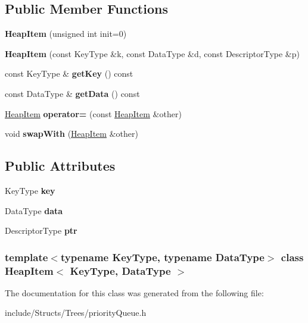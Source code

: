 \subsection*{Public Member Functions}
\begin{DoxyCompactItemize}
\item 
\hypertarget{class_heap_item_a03c42d4bbc4c16ee8abc7fd6b1c97767}{
{\bfseries HeapItem} (unsigned int init=0)}
\label{class_heap_item_a03c42d4bbc4c16ee8abc7fd6b1c97767}

\item 
\hypertarget{class_heap_item_add75cdd3ec5a8f0d3442e4a6ab4e862b}{
{\bfseries HeapItem} (const KeyType \&k, const DataType \&d, const DescriptorType \&p)}
\label{class_heap_item_add75cdd3ec5a8f0d3442e4a6ab4e862b}

\item 
\hypertarget{class_heap_item_a9ebbd7fe9118ec76958c0ea8ebb9cec2}{
const KeyType \& {\bfseries getKey} () const }
\label{class_heap_item_a9ebbd7fe9118ec76958c0ea8ebb9cec2}

\item 
\hypertarget{class_heap_item_a48266d15d7941344d977a157d23f4b15}{
const DataType \& {\bfseries getData} () const }
\label{class_heap_item_a48266d15d7941344d977a157d23f4b15}

\item 
\hypertarget{class_heap_item_ab285b88a3143ca4e88fd7ad4151a22e3}{
\hyperlink{class_heap_item}{HeapItem} {\bfseries operator=} (const \hyperlink{class_heap_item}{HeapItem} \&other)}
\label{class_heap_item_ab285b88a3143ca4e88fd7ad4151a22e3}

\item 
\hypertarget{class_heap_item_a3dcc271e453d3f48ad9da5912c818781}{
void {\bfseries swapWith} (\hyperlink{class_heap_item}{HeapItem} \&other)}
\label{class_heap_item_a3dcc271e453d3f48ad9da5912c818781}

\end{DoxyCompactItemize}
\subsection*{Public Attributes}
\begin{DoxyCompactItemize}
\item 
\hypertarget{class_heap_item_ad9d7dd6dcc9c0e56bd1830d655b2474e}{
KeyType {\bfseries key}}
\label{class_heap_item_ad9d7dd6dcc9c0e56bd1830d655b2474e}

\item 
\hypertarget{class_heap_item_ab04530f960d08905da1d1daca2b7195d}{
DataType {\bfseries data}}
\label{class_heap_item_ab04530f960d08905da1d1daca2b7195d}

\item 
\hypertarget{class_heap_item_ac10765cbc796d405af99bd8f60fbd67a}{
DescriptorType {\bfseries ptr}}
\label{class_heap_item_ac10765cbc796d405af99bd8f60fbd67a}

\end{DoxyCompactItemize}
\subsubsection*{template$<$typename KeyType, typename DataType$>$ class HeapItem$<$ KeyType, DataType $>$}



The documentation for this class was generated from the following file:\begin{DoxyCompactItemize}
\item 
include/Structs/Trees/priorityQueue.h\end{DoxyCompactItemize}

